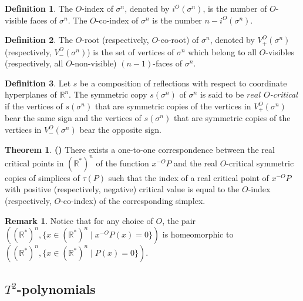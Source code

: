 \documentclass[12pt]{article}
\newcommand{\R}{\mathbb{R}}
\theoremstyle{definition}
\newtheorem{defin}{Definition}[section]
\newtheorem{thm}{Theorem}[section]
\newtheorem{rmk}{Remark}[section]
\begin{document}
\begin{defin}
    The $O$-index of $\sigma^n$, denoted by $i^O(\sigma^n)$, is the number of $O$-visible faces of $\sigma^n$. The $O$-co-index of $\sigma^n$ is the number $n-i^O(\sigma^n)$.
\end{defin}

\begin{defin}
    The $O$-root (respectively, $O$-co-root) of $\sigma^n$, denoted by $V_+^O(\sigma^n)$ (respectively, $V_-^O(\sigma^n)$) is the set of vertices of $\sigma^n$ which belong to all $O$-visibles (respectively, all $O$-non-visible) $(n-1)$-faces of $\sigma^n$. 
\end{defin}

\begin{defin}
    Let $s$ be a composition of reflections with respect to coordinate hyperplanes of $\mathbb{R}^n$. The symmetric copy $s(\sigma^n)$ of $\sigma^n$ is said to be $\textit{real}$ $O$\textit{-critical} if the vertices of $s(\sigma^n)$ that are symmetric copies of the vertices in $V_+^O(\sigma^n)$ bear the same sign and the vertices of $s(\sigma^n)$ that are symmetric copies of the vertices in $V_-^O(\sigma^n)$ bear the opposite sign.
\end{defin}

\begin{thm}
    \textbf{(\cite{itenbergshustincritpts})} \label{thmitenbergshustin} There exists a one-to-one correspondence between the real critical points in $(\R^*)^n$ of the function $x^{-O} P$ and the real $O$-critical symmetric copies of simplices of $\tau(P)$ such that the index of a real critical point of $x^{-O}P$ with positive (respectively, negative)  critical value is equal to the $O$-index (respectively, $O$-co-index) of the corresponding simplex.
\end{thm}

\begin{rmk}
    Notice that for any choice of $O$, the pair $((\R^*)^n,\{x \in (\R^*)^n\;|\; x^{-O} P(x) = 0\})$ is homeomorphic to $((\R^*)^n,\{x \in (\R^*)^n\;|\;P(x) = 0\})$.
\end{rmk}

\subsection{$T^2$-polynomials}
\end{document}

